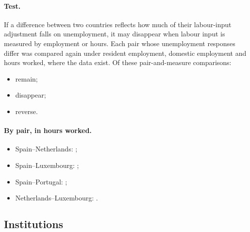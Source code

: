 \paragraph{Test.} If a difference between two countries reflects how much of their
labour-input adjustment falls on unemployment, it may disappear when labour input is
measured by employment or hours. Each pair whose unemployment responses differ was compared
again under resident employment, domestic employment and hours worked, where the data
exist. Of these pair-and-measure comparisons:
\begin{itemize}
  \item {} remain;
  \item {} disappear;
  \item {} reverse.
\end{itemize}

\paragraph{By pair, in hours worked.}
\begin{itemize}
  \item Spain--Netherlands: ;
  \item Spain--Luxembourg: ;
  \item Spain--Portugal: ;
  \item Netherlands--Luxembourg: .
\end{itemize}

\subsection{Institutions}\label{sec:institutions}

